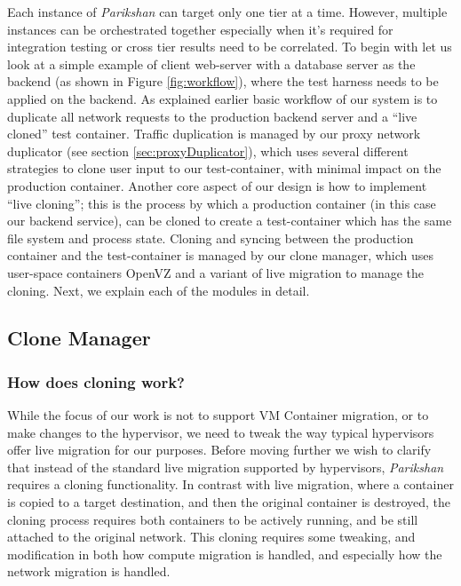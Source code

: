 Each instance of \textit{Parikshan} can target only one tier at a time.
However, multiple instances can be orchestrated together especially when it's required for integration testing or cross tier results need to be correlated.
To begin with let us look at a simple example of client web-server with a database server as the backend (as shown in Figure \ref{fig:workflow}), where the test harness needs to be applied on the backend.
As explained earlier basic workflow of our system is to duplicate all network requests to the production backend server and a ``live cloned'' test container.
Traffic duplication is managed by our proxy network duplicator (see section \ref{sec:proxyDuplicator}), which uses several different strategies to clone user input to our test-container, with minimal impact on the production container.
Another core aspect of our design is how to implement ``live cloning''; this is the process by which a production container (in this case our backend service), can be cloned to create a test-container which has the same file system and process state. 
Cloning and syncing between the production container and the test-container is managed by our clone manager, which uses user-space containers OpenVZ and a variant of live migration to manage the cloning.
Next, we explain each of the modules in detail.


\subsection{Clone Manager} 
\label{sec:CloneManager}

\subsubsection{How does cloning work?}
\label{sec:cloning}

While the focus of our work is not to support VM Container migration, or to make changes to the hypervisor, we need to tweak the way typical hypervisors offer live migration for our purposes.
Before moving further we wish to clarify that instead of the standard live migration supported by hypervisors, \textit{Parikshan} requires a cloning functionality. 
In contrast with live migration, where a container is copied to a target destination, and then the original container is destroyed, the cloning process requires both containers to be actively running, and be still attached to the original network.
This cloning requires some tweaking, and modification in both how compute migration is handled, and especially how the network migration is handled. 

